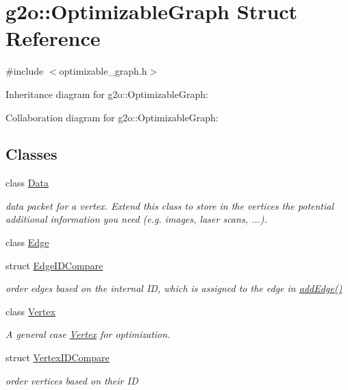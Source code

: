 \hypertarget{structg2o_1_1OptimizableGraph}{}\section{g2o\+:\+:Optimizable\+Graph Struct Reference}
\label{structg2o_1_1OptimizableGraph}


{\ttfamily \#include $<$optimizable\+\_\+graph.\+h$>$}



Inheritance diagram for g2o\+:\+:Optimizable\+Graph\+:


Collaboration diagram for g2o\+:\+:Optimizable\+Graph\+:
\subsection*{Classes}
\begin{DoxyCompactItemize}
\item 
class \hyperlink{classg2o_1_1OptimizableGraph_1_1Data}{Data}
\begin{DoxyCompactList}\small\item\em data packet for a vertex. Extend this class to store in the vertices the potential additional information you need (e.\+g. images, laser scans, ...). \end{DoxyCompactList}\item 
class \hyperlink{classg2o_1_1OptimizableGraph_1_1Edge}{Edge}
\item 
struct \hyperlink{structg2o_1_1OptimizableGraph_1_1EdgeIDCompare}{Edge\+I\+D\+Compare}
\begin{DoxyCompactList}\small\item\em order edges based on the internal ID, which is assigned to the edge in \hyperlink{structg2o_1_1OptimizableGraph_a6831ed69fce3dba691f53302a2813070}{add\+Edge()} \end{DoxyCompactList}\item 
class \hyperlink{classg2o_1_1OptimizableGraph_1_1Vertex}{Vertex}
\begin{DoxyCompactList}\small\item\em A general case \hyperlink{classg2o_1_1OptimizableGraph_1_1Vertex}{Vertex} for optimization. \end{DoxyCompactList}\item 
struct \hyperlink{structg2o_1_1OptimizableGraph_1_1VertexIDCompare}{Vertex\+I\+D\+Compare}
\begin{DoxyCompactList}\small\item\em order vertices based on their ID \end{DoxyCompactList}\end{DoxyCompactItemize}
